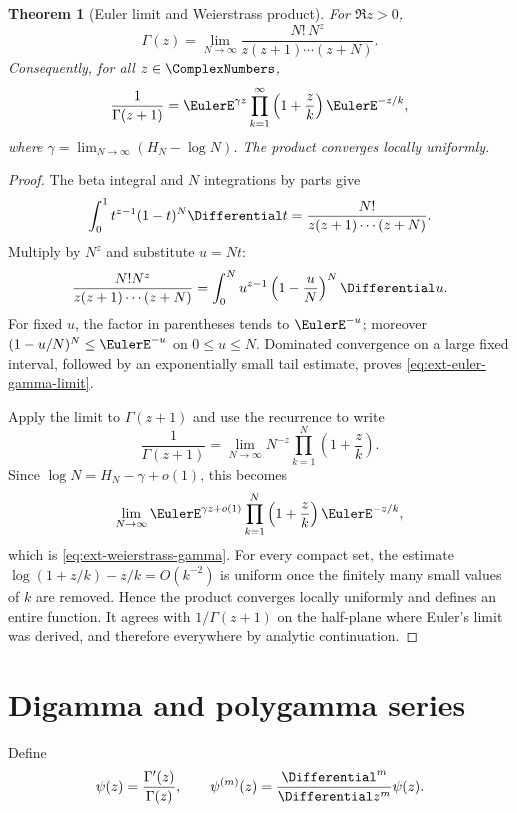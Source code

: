 \documentclass[11pt,a4paper,oneside,openany]{book}
\newtheorem{theorem}{Theorem}[chapter]
\theoremstyle{definition}
\theoremstyle{remark}
\begin{document}
\begin{theorem}[Euler limit and Weierstrass product]
For \(\Re z>0\),
\begin{equation}\label{eq:ext-euler-gamma-limit}
 \Gamma(z)=\lim_{N\to\infty}
 \frac{N!\,N^z}{z(z+1)\cdots(z+N)}.
\end{equation}
Consequently, for all \(z\in\ComplexNumbers\),
\begin{equation}\label{eq:ext-weierstrass-gamma}
 \frac1{\Gamma(z+1)}
 =\EulerE^{\gamma z}\prod_{k=1}^\infty
 \left(1+\frac zk\right)\EulerE^{-z/k},
\end{equation}
where \(\gamma=\lim_{N\to\infty}(H_N-\log N)\).  The product converges
locally uniformly.
\end{theorem}
\begin{proof}
The beta integral and \(N\) integrations by parts give
\[
 \int_0^1t^{z-1}(1-t)^N\Differential t
 =\frac{N!}{z(z+1)\cdots(z+N)}.
\]
Multiply by \(N^z\) and substitute \(u=Nt\):
\[
 \frac{N!N^z}{z(z+1)\cdots(z+N)}
 =\int_0^N u^{z-1}\left(1-\frac uN\right)^N\Differential u.
\]
For fixed \(u\), the factor in parentheses tends to \(\EulerE^{-u}\); moreover
\((1-u/N)^N\le \EulerE^{-u}\) on \(0\le u\le N\).  Dominated convergence on a
large fixed interval, followed by an exponentially small tail estimate, proves
\eqref{eq:ext-euler-gamma-limit}.

Apply the limit to \(\Gamma(z+1)\) and use the recurrence to write
\[
 \frac1{\Gamma(z+1)}
 =\lim_{N\to\infty}N^{-z}\prod_{k=1}^N\left(1+\frac zk\right).
\]
Since \(\log N=H_N-\gamma+o(1)\), this becomes
\[
 \lim_{N\to\infty}\EulerE^{\gamma z+o(1)}
 \prod_{k=1}^N\left(1+\frac zk\right)\EulerE^{-z/k},
\]
which is \eqref{eq:ext-weierstrass-gamma}.  For every compact set, the estimate
\(\log(1+z/k)-z/k=O(k^{-2})\) is uniform once the finitely many small values
of \(k\) are removed.  Hence the product converges locally uniformly and
defines an entire function.  It agrees with \(1/\Gamma(z+1)\) on the half-plane
where Euler's limit was derived, and therefore everywhere by analytic
continuation.
\end{proof}

\section{Digamma and polygamma series}

Define
\begin{equation}\label{eq:ext-digamma-def}
 \psi(z)=\frac{\Gamma'(z)}{\Gamma(z)},\qquad
 \psi^{(m)}(z)=\frac{\Differential^m}{\Differential z^m}\psi(z).
\end{equation}
\end{document}
